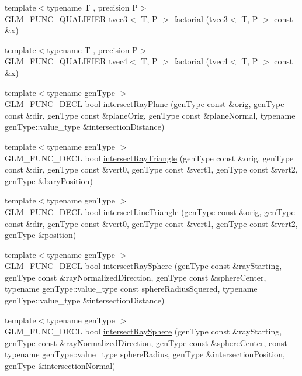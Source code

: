 \begin{DoxyCompactItemize}
\item 
{\footnotesize template$<$typename T , precision P$>$ }\\G\+L\+M\+\_\+\+F\+U\+N\+C\+\_\+\+Q\+U\+A\+L\+I\+F\+I\+E\+R tvec3$<$ T, P $>$ \hyperlink{namespaceglm_ab41ee15497a5efb175292e635daa4918}{factorial} (tvec3$<$ T, P $>$ const \&x)
\item 
{\footnotesize template$<$typename T , precision P$>$ }\\G\+L\+M\+\_\+\+F\+U\+N\+C\+\_\+\+Q\+U\+A\+L\+I\+F\+I\+E\+R tvec4$<$ T, P $>$ \hyperlink{namespaceglm_a521766929c175b805ff9856d23c4e36c}{factorial} (tvec4$<$ T, P $>$ const \&x)
\item 
{\footnotesize template$<$typename gen\+Type $>$ }\\G\+L\+M\+\_\+\+F\+U\+N\+C\+\_\+\+D\+E\+C\+L bool \hyperlink{group__gtx__intersect_gad3697a9700ea379739a667ea02573488}{intersect\+Ray\+Plane} (gen\+Type const \&orig, gen\+Type const \&dir, gen\+Type const \&plane\+Orig, gen\+Type const \&plane\+Normal, typename gen\+Type\+::value\+\_\+type \&intersection\+Distance)
\item 
{\footnotesize template$<$typename gen\+Type $>$ }\\G\+L\+M\+\_\+\+F\+U\+N\+C\+\_\+\+D\+E\+C\+L bool \hyperlink{group__gtx__intersect_gab16c1b47c10451e7604b51b39a7ef21d}{intersect\+Ray\+Triangle} (gen\+Type const \&orig, gen\+Type const \&dir, gen\+Type const \&vert0, gen\+Type const \&vert1, gen\+Type const \&vert2, gen\+Type \&bary\+Position)
\item 
{\footnotesize template$<$typename gen\+Type $>$ }\\G\+L\+M\+\_\+\+F\+U\+N\+C\+\_\+\+D\+E\+C\+L bool \hyperlink{group__gtx__intersect_ga9d29b9b3acb504d43986502f42740df4}{intersect\+Line\+Triangle} (gen\+Type const \&orig, gen\+Type const \&dir, gen\+Type const \&vert0, gen\+Type const \&vert1, gen\+Type const \&vert2, gen\+Type \&position)
\item 
{\footnotesize template$<$typename gen\+Type $>$ }\\G\+L\+M\+\_\+\+F\+U\+N\+C\+\_\+\+D\+E\+C\+L bool \hyperlink{group__gtx__intersect_gac88f8cd84c4bcb5b947d56acbbcfa56e}{intersect\+Ray\+Sphere} (gen\+Type const \&ray\+Starting, gen\+Type const \&ray\+Normalized\+Direction, gen\+Type const \&sphere\+Center, typename gen\+Type\+::value\+\_\+type const sphere\+Radius\+Squered, typename gen\+Type\+::value\+\_\+type \&intersection\+Distance)
\item 
{\footnotesize template$<$typename gen\+Type $>$ }\\G\+L\+M\+\_\+\+F\+U\+N\+C\+\_\+\+D\+E\+C\+L bool \hyperlink{group__gtx__intersect_gad28c00515b823b579c608aafa1100c1d}{intersect\+Ray\+Sphere} (gen\+Type const \&ray\+Starting, gen\+Type const \&ray\+Normalized\+Direction, gen\+Type const \&sphere\+Center, const typename gen\+Type\+::value\+\_\+type sphere\+Radius, gen\+Type \&intersection\+Position, gen\+Type \&intersection\+Normal)

\end{DoxyCompactItemize}
